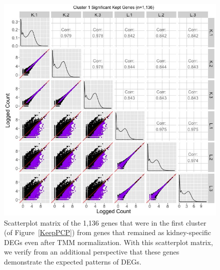 \documentclass{article}
\begin{document}
\null
\begin{figure}[t!]
\centerline{\includegraphics[width=1\columnwidth]{../MakeFigures/lkClustersKeepSM.jpg}}
\caption{Scatterplot matrix of the 1,136 genes that were in the first cluster (of Figure~\ref{KeepPCP}) from genes that remained as kidney-specific DEGs even after TMM normalization. With this scatterplot matrix, we verify from an additional perspective that these genes demonstrate the expected patterns of DEGs.
\label{lkClustersKeepSM}}
\end{figure}
\end{document}
